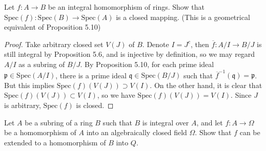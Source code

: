 \documentclass{solution}
\begin{document}
\begin{problem}
    Let $f: A \rightarrow B$ be an integral homomorphism of rings. Show that $\mathrm{Spec}(f): \mathrm{Spec}(B) \rightarrow \mathrm{Spec}(A)$ is a closed mapping. (This is a geometrical equivalent of Proposition 5.10)
\end{problem}

\begin{proof}
    Take arbitrary closed set $V(J)$ of $B$. Denote $I = J^c$, then $\overline{f}: A / I \rightarrow B / J$ is still integral by Proposition 5.6, and is injective by definition, so we may regard $A / I$ as a subring of $B / J$. By Proposition 5.10, for each prime ideal $\mathfrak{p} \in \mathrm{Spec}(A / I)$, there is a prime ideal $\mathfrak{q} \in \mathrm{Spec}(B / J)$ such that $\overline{f}^{-1} (\mathfrak{q}) = \mathfrak{p}$. But this implies $\mathrm{Spec}(f)(V(J)) \supset V(I)$. On the other hand, it is clear that $\mathrm{Spec}(f)(V(J)) \subset V(I)$, so we have $\mathrm{Spec}(f)(V(J)) = V(I)$. Since $J$ is arbitrary, $\mathrm{Spec}(f)$ is closed.
\end{proof}

\begin{problem}
    Let $A$ be a subring of a ring $B$ such that $B$ is integral over $A$, and let $f: A \rightarrow \Omega$ be a homomorphism of $A$ into an algebraically closed field $\Omega$. Show that $f$ can be extended to a homomorphism of $B$ into $Q$.
\end{problem}
\end{document}
